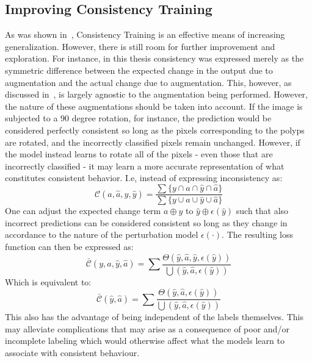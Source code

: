   \subsection{Improving Consistency Training} \label{new_closs}
    As was shown in~, Consistency Training is an effective means of increasing generalization. However, there is still room for further improvement and exploration. For instance, in this thesis consistency was expressed merely as the symmetric difference between the expected change in the output due to augmentation and the actual change due to augmentation. This, however, as discussed in~, is largely agnostic to the augmentation being performed. However, the nature of these augmentations should be taken into account. If the image is subjected to a 90 degree rotation, for instance, the prediction would be considered perfectly consistent so long as the pixels corresponding to the polyps are rotated, and the incorrectly classified pixels remain unchanged. However, if the model instead learns to rotate all of the pixels - even those that are incorrectly classified - it may learn a more accurate representation of what constitutes consistent behavior. I.e, instead of expressing inconsistency as:
\begin{equation*}
\mathcal{C}(a, \hat{a},y, \hat{y}) = \frac{\sum\{y \cap a \cap \hat{y} \cap \hat{a} \}}
{\sum\{ y \cup a \cup \hat{y} \cup \hat{a} \}}
\end{equation*}
    One can adjust the expected change term \(a\oplus y\) to \(\hat{y}\oplus \epsilon(\hat{y})\) such that also incorrect predictions can be considered consistent so long as they change in accordance to the nature of the perturbation model \(\epsilon(\cdot)\). The resulting loss function can then be expressed as:
\begin{equation*}
    \bar{\mathcal{C}}(y,a,\hat{y}, \hat{a}) = \sum \frac{\Theta(\hat{y}, \hat{a},  \hat{y}, \epsilon( \hat{y}))}{\bigcup(\hat{y}, \hat{a}, \epsilon(\hat{y}))}
\end{equation*}
Which is equivalent to:
\begin{equation*}
    \bar{\mathcal{C}}(\hat{y}, \hat{a}) = \sum \frac{\Theta(\hat{y}, \hat{a}, \epsilon( \hat{y}))}{\bigcup(\hat{y}, \hat{a}, \epsilon( \hat{y}))}
\end{equation*}
    This also has the advantage of being independent of the labels themselves. This may alleviate complications that may arise as a consequence of poor and/or incomplete labeling which would otherwise affect what the models learn to associate with consistent behaviour. 

